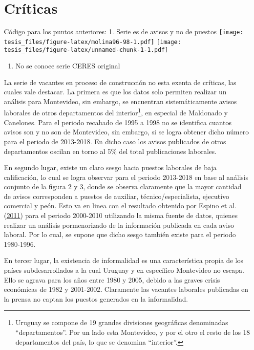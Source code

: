 \documentclass[12pt,twoside]{reedthesis}
\providecommand{\tightlist}{%
  \setlength{\itemsep}{0pt}\setlength{\parskip}{0pt}}
\begin{document}
\hypertarget{cruxedticas}{%
\section{Críticas}\label{cruxedticas}}

Código para los puntos anteriores:
1. Serie es de avisos y no de puestos
\texttt{[image: tesis\_files/figure-latex/molina96-98-1.pdf]}
\texttt{[image: tesis\_files/figure-latex/unnamed-chunk-1-1.pdf]}
\begin{enumerate}
\def\labelenumi{\arabic{enumi}.}
\setcounter{enumi}{1}
\tightlist
\item
  No se conoce serie CERES original
\end{enumerate}
La serie de vacantes en proceso de construcción no esta exenta de críticas, las cuales vale destacar. La primera es que los datos solo permiten realizar un análisis para Montevideo, sin embargo, se encuentran sistemáticamente avisos laborales de otros departamentos del interior\footnote{Uruguay se compone de 19 grandes divisiones geográficas denominadas ``departamentos''. Por un lado esta Montevideo, y por el otro el resto de los 18 departamentos del país, lo que se denomina ``interior''.}, en especial de Maldonado y Canelones. Para el periodo recabado de 1995 a 1998 no se identifica cuantos avisos son y no son de Montevideo, sin embargo, si se logra obtener dicho número para el periodo de 2013-2018. En dicho caso los avisos publicados de otros departamentos oscilan en torno al 5\% del total publicaciones laborales.

En segundo lugar, existe un claro sesgo hacia puestos laborales de baja calificación, lo cual se logra observar para el periodo 2013-2018 en base al análisis conjunto de la figura 2 y 3, donde se observa claramente que la mayor cantidad de avisos corresponden a puestos de auxiliar, técnico/especialista, ejecutivo comercial y peón. Esto va en linea con el resultado obtenido por Espino et al. (\protect\hyperlink{ref-Alma2011}{2011}) para el periodo 2000-2010 utilizando la misma fuente de datos, quienes realizar un análisis pormenorizado de la información publicada en cada aviso laboral. Por lo cual, se supone que dicho sesgo también existe para el periodo 1980-1996.

En tercer lugar, la existencia de informalidad es una característica propia de los países subdesarrollados a la cual Uruguay y en específico Montevideo no escapa. Ello se agrava para los años entre 1980 y 2005, debido a las graves crisis económicas de 1982 y 2001-2002. Claramente las vacantes laborales publicadas en la prensa no captan los puestos generados en la informalidad.
\end{document}
